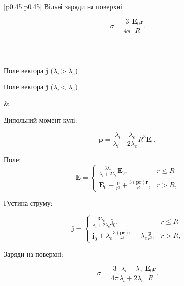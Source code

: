 \documentclass[12pt, oneside]{extarticle}
\newcommand{\vect}[1]{\symbf{#1}}
\newcommand{\vect}[1]{\mathbf{#1}}
\def\Efield{\vect{E}}
\begin{document}
\begin{center}
\begin{longtable}{|p{}|p{}|}
		Вільні заряди на поверхні:

		\[\sigma = \frac{3}{4\pi} \frac{\Efield_0\vect{r}}{R}.\]

		\\
		\hline
		                                                                                                                     \\
		\hline

		\begin{center}

			Поле вектора $\vect{j}$ ($\lambda_i > \lambda_e$)

			

			Поле вектора $\vect{j}$ ($\lambda_i < \lambda_e$)

			

		\end{center}


		                                                                                                                   &

		Дипольний момент кулі:

		\[\vect{p} = \frac{\lambda_i - \lambda_e}{\lambda_i + 2\lambda_e}R^3\Efield_0,\]

		Поле:
		\[
			\Efield =
			\begin{cases}
				\frac{3\lambda_e}{\lambda_i + 2\lambda_e} \Efield_0,                                    & r \le R \\
				\Efield_0 - \frac{\vect{p}}{r^3} + \frac{3\left(\vect{p}\vect{r}\right)\vect{r} }{r^5}, & r > R,
			\end{cases}
		\]

		Густина струму:

		\[
			\vect{j} =
			\begin{cases}
				\frac{3\lambda_e}{\lambda_i + 2\lambda_e} \vect{j}_0,                                                       & r \le R \\
				\vect{j}_0  + \lambda_e\frac{3\left(\vect{p}\vect{r}\right)\vect{r} }{r^5} - \lambda_e\frac{\vect{p}}{r^3}, & r > R,
			\end{cases}
		\]

		Заряди на поверхні:

		\[\sigma = \frac{3}{4\pi} \frac{\lambda_i - \lambda_e}{\lambda_i + 2\lambda_e} \frac{\Efield_0\vect{r}}{R}.\]
		\\
		\hline\pagebreak
		                                                                                                                                   \\
		\hline



\end{longtable}
\end{center}
\end{document}
